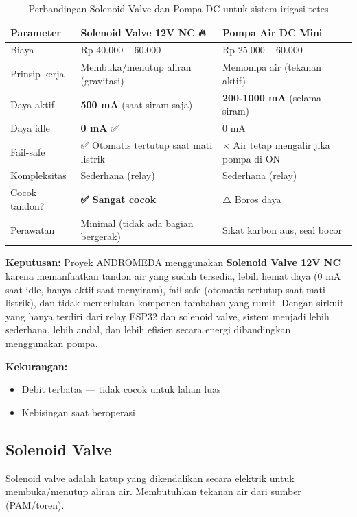 \documentclass[12pt,a4paper,oneside]{report}
\begin{document}
\begin{table}[H]
\centering
\caption{Perbandingan Solenoid Valve dan Pompa DC untuk sistem irigasi tetes}
\label{tab:actuator-compare}
\begin{tabularx}{\textwidth}{l X X}
\toprule
\textbf{Parameter} & \textbf{Solenoid Valve 12V NC 🔥} & \textbf{Pompa Air DC Mini} \\
\midrule
Biaya & Rp 40.000 -- 60.000 & Rp 25.000 -- 60.000 \\
Prinsip kerja & Membuka/menutup aliran (gravitasi) & Memompa air (tekanan aktif) \\
Daya aktif & \textbf{500 mA} (saat siram saja) & \textbf{200-1000 mA} (selama siram) \\
Daya idle & \textbf{0 mA} ✅ & 0 mA \\
Fail-safe & ✅ Otomatis tertutup saat mati listrik & × Air tetap mengalir jika pompa di ON \\
Kompleksitas & Sederhana (relay) & Sederhana (relay) \\
Cocok tandon? & \textbf{✅ Sangat cocok} & ⚠️ Boros daya \\
Perawatan & Minimal (tidak ada bagian bergerak) & Sikat karbon aus, seal bocor \\
\bottomrule
\end{tabularx}
\end{table}

\textbf{Keputusan:} Proyek ANDROMEDA menggunakan \textbf{Solenoid Valve 12V NC} karena memanfaatkan tandon air yang sudah tersedia, lebih hemat daya (0 mA saat idle, hanya aktif saat menyiram), fail-safe (otomatis tertutup saat mati listrik), dan tidak memerlukan komponen tambahan yang rumit. Dengan sirkuit yang hanya terdiri dari relay ESP32 dan solenoid valve, sistem menjadi lebih sederhana, lebih andal, dan lebih efisien secara energi dibandingkan menggunakan pompa.

\textbf{Kekurangan:}
\begin{itemize}
    \item Debit terbatas — tidak cocok untuk lahan luas
    \item Kebisingan saat beroperasi
\end{itemize}

\subsection{Solenoid Valve}

Solenoid valve adalah katup yang dikendalikan secara elektrik untuk membuka/menutup aliran air. Membutuhkan tekanan air dari sumber (PAM/toren).
\end{document}
